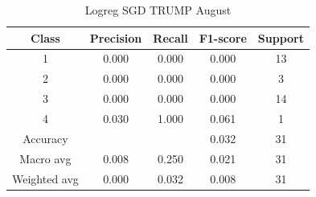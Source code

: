 \begin{enumerate}
\begin{enumerate}
\begin{table}[H]
                \vspace{1em}
                
                \scriptsize
                \begin{tabular}{c|cccc}
                \hline
                Class & Precision & Recall & F1-score & Support \\
                \hline
                1 & 0.000 & 0.000 & 0.000 & 13 \\
                2 & 0.000 & 0.000 & 0.000 & 3 \\
                3 & 0.000 & 0.000 & 0.000 & 14 \\
                4 & 0.030 & 1.000 & 0.061 & 1 \\
                \hline
                Accuracy &       &      & 0.032 & 31 \\
                Macro avg & 0.008 & 0.250 & 0.021 & 31 \\
                Weighted avg & 0.000 & 0.032 & 0.008 & 31 \\
                \hline
                \end{tabular}
                \caption{Logreg SGD TRUMP August}
                \label{tab:classifier_2_report_logreg_sgd_trump_non_filtered_aug}
                \end{table}




    
    
                
            \end{enumerate}

    \end{enumerate}

    \pagebreak

